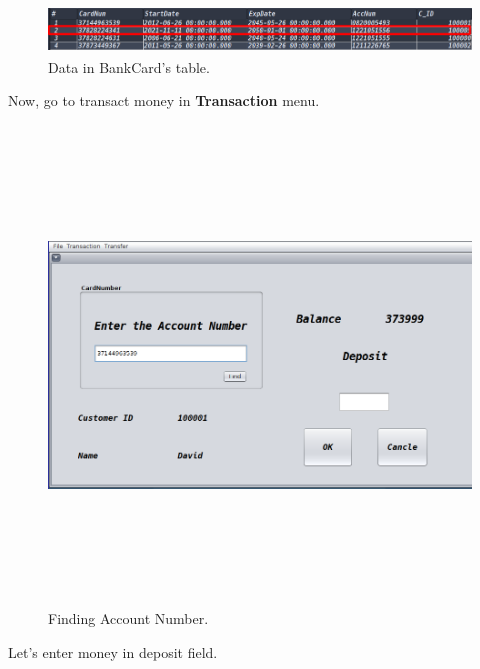 \documentclass[12pt,a4paper]{article}
\begin{document}
\begin{figure}[H]
        \centering
        \includegraphics[width=5.5in,height=0.5in]{Picture/resultInserting2.png}
        \caption{Data in BankCard's table.}
    \end{figure}
\newpage
\indent Now, go to transact money in \textbf{Transaction} menu.
\begin{figure}[H]
        \centering
        \includegraphics[width=5.5in,height=5in]{Picture/findAccNum.png}
        \caption{Finding Account Number.}
    \end{figure}
\newpage
\indent Let's enter money in deposit field.
\end{document}
